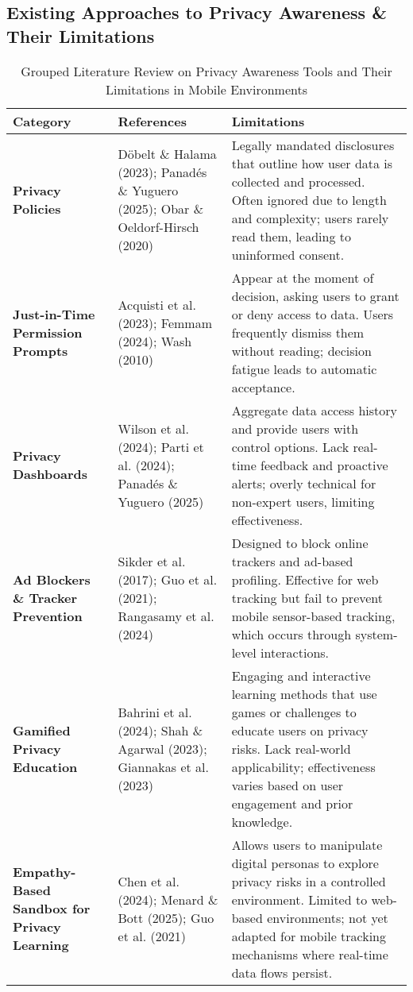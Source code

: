 \documentclass[acmlarge, nonacm]{acmart}
\begin{document}
\subsection{Existing Approaches to Privacy Awareness \& Their Limitations}

\begin{table*}[ht]
\centering
\begin{tabular}{|p{2cm}|p{3cm}|p{10cm}|}
\hline
\textbf{Category} & \textbf{References} & \textbf{Limitations} \\
\hline
\textbf{Privacy Policies} & Döbelt \& Halama (2023); Panadés \& Yuguero (2025); Obar \& Oeldorf-Hirsch (2020) & Legally mandated disclosures that outline how user data is collected and processed. Often ignored due to length and complexity; users rarely read them, leading to uninformed consent. \\
\hline
\textbf{Just-in-Time Permission Prompts} & Acquisti et al. (2023); Femmam (2024); Wash (2010) & Appear at the moment of decision, asking users to grant or deny access to data. Users frequently dismiss them without reading; decision fatigue leads to automatic acceptance. \\
\hline
\textbf{Privacy Dashboards} & Wilson et al. (2024); Parti et al. (2024); Panadés \& Yuguero (2025) & Aggregate data access history and provide users with control options. Lack real-time feedback and proactive alerts; overly technical for non-expert users, limiting effectiveness. \\
\hline
\textbf{Ad Blockers \& Tracker Prevention} & Sikder et al. (2017); Guo et al. (2021); Rangasamy et al. (2024) & Designed to block online trackers and ad-based profiling. Effective for web tracking but fail to prevent mobile sensor-based tracking, which occurs through system-level interactions. \\
\hline
\textbf{Gamified Privacy Education} & Bahrini et al. (2024); Shah \& Agarwal (2023); Giannakas et al. (2023) & Engaging and interactive learning methods that use games or challenges to educate users on privacy risks. Lack real-world applicability; effectiveness varies based on user engagement and prior knowledge. \\
\hline
\textbf{Empathy-Based Sandbox for Privacy Learning} & Chen et al. (2024); Menard \& Bott (2025); Guo et al. (2021) & Allows users to manipulate digital personas to explore privacy risks in a controlled environment. Limited to web-based environments; not yet adapted for mobile tracking mechanisms where real-time data flows persist. \\
\hline
\end{tabular}
\caption{Grouped Literature Review on Privacy Awareness Tools and Their Limitations in Mobile Environments}
\label{tab:privacy_awareness_lit_review}
\end{table*}
\end{document}
